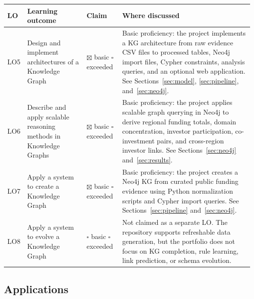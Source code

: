 \documentclass[11pt,a4paper]{article}
\newcommand{\checkedbox}{\(\boxtimes\)}
\newcommand{\emptybox}{\(\square\)}
\begin{document}
\begin{longtable}{p{}p{}p{}p{}}
\toprule
LO & Learning outcome & Claim & Where discussed \\
\midrule
\endhead
LO5 & Design and implement architectures of a Knowledge Graph &
\checkedbox{} basic \quad \emptybox{} exceeded &
Basic proficiency: the project implements a KG architecture from raw evidence
CSV files to processed tables, Neo4j import files, Cypher constraints, analysis
queries, and an optional web application. See Sections~\ref{sec:model},
\ref{sec:pipeline}, and~\ref{sec:neo4j}. \\
\addlinespace
LO6 & Describe and apply scalable reasoning methods in Knowledge Graphs &
\checkedbox{} basic \quad \emptybox{} exceeded &
Basic proficiency: the project applies scalable graph querying in Neo4j to
derive regional funding totals, domain concentration, investor participation,
co-investment pairs, and cross-region investor links. See Sections~\ref{sec:neo4j}
and~\ref{sec:results}. \\
\addlinespace
LO7 & Apply a system to create a Knowledge Graph &
\checkedbox{} basic \quad \emptybox{} exceeded &
Basic proficiency: the project creates a Neo4j KG from curated public funding
evidence using Python normalization scripts and Cypher import queries. See
Sections~\ref{sec:pipeline} and~\ref{sec:neo4j}. \\
\addlinespace
LO8 & Apply a system to evolve a Knowledge Graph &
\emptybox{} basic \quad \emptybox{} exceeded &
Not claimed as a separate LO. The repository supports refreshable data
generation, but the portfolio does not focus on KG completion, rule learning,
link prediction, or schema evolution. \\
\bottomrule
\end{longtable}

\subsection*{Applications}
\end{document}
